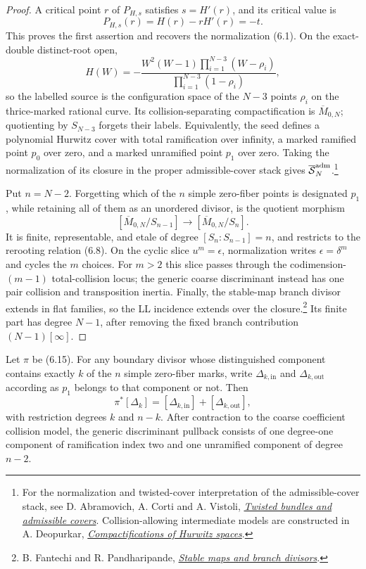 \begin{proof}
A critical point $r$ of $P_{H,s}$ satisfies $s=H'(r)$, and its critical value
is
\[
 P_{H,s}(r)=H(r)-rH'(r)=-t.
\]
This proves the first assertion and recovers the normalization (6.1).
On the exact-double distinct-root open,
\[
 H(W)=-\frac{W^2(W-1)\prod_{i=1}^{N-3}(W-\rho_i)}
                  {\prod_{i=1}^{N-3}(1-\rho_i)},
\]
so the labelled source is the configuration space of the $N-3$ points
$\rho_i$ on the thrice-marked rational curve.  Its collision-separating
compactification is $\overline M_{0,N}$; quotienting by $S_{N-3}$ forgets
their labels.  Equivalently, the seed defines a polynomial Hurwitz cover
with total ramification over infinity, a marked ramified point $p_0$ over
zero, and a marked unramified point $p_1$ over zero.  Taking the normalization
of its closure in the proper admissible-cover stack gives
$\overline{\mathcal S}^{\rm adm}_N$.\footnote{For the normalization and
twisted-cover interpretation of the admissible-cover stack, see D. Abramovich,
A. Corti and A. Vistoli,
\href{https://arxiv.org/abs/math/0106211}{\emph{Twisted bundles and admissible
covers}}.  Collision-allowing intermediate models are constructed in
A. Deopurkar,
\href{https://arxiv.org/abs/1206.4535}{\emph{Compactifications of Hurwitz
spaces}}.}

Put $n=N-2$.  Forgetting which of the $n$ simple zero-fiber points is
designated $p_1$, while retaining all of them as an unordered divisor, is the
quotient morphism
\[
 [\overline M_{0,N}/S_{n-1}]
 \longrightarrow[\overline M_{0,N}/S_n].             \tag{6.15}
\]
It is finite, representable, and etale of degree
$[S_n:S_{n-1}]=n$, and restricts to the rerooting relation (6.8).  On the
cyclic slice $u^m=\epsilon$, normalization writes
$\epsilon=\delta^m$ and cycles the $m$ choices.  For $m>2$ this slice passes
through the codimension-$(m-1)$ total-collision locus; the generic coarse
discriminant instead has one pair collision and transposition inertia.
Finally, the stable-map branch divisor extends
in flat families, so the LL incidence extends over the closure.\footnote{B.
Fantechi and R. Pandharipande,
\href{https://arxiv.org/abs/math/9905104}{\emph{Stable maps and branch
divisors}}.}  Its finite part has degree $N-1$, after removing the fixed
branch contribution $(N-1)[\infty]$.
\end{proof}

\begin{proposition}
\label{prop:rerooting-boundary-pullback}
Let $\pi$ be (6.15).  For any boundary divisor whose distinguished component
contains exactly $k$ of the $n$ simple zero-fiber marks, write
$\Delta_{k,\mathrm{in}}$ and $\Delta_{k,\mathrm{out}}$ according as $p_1$
belongs to that component or not.  Then
\[
 \pi^*[\Delta_k]
  =[\Delta_{k,\mathrm{in}}]+[\Delta_{k,\mathrm{out}}], \tag{6.16}
\]
with restriction degrees $k$ and $n-k$.  After contraction to the coarse
coefficient collision model, the generic discriminant pullback consists of
one degree-one component of ramification index two and one unramified
component of degree $n-2$.
\end{proposition}

